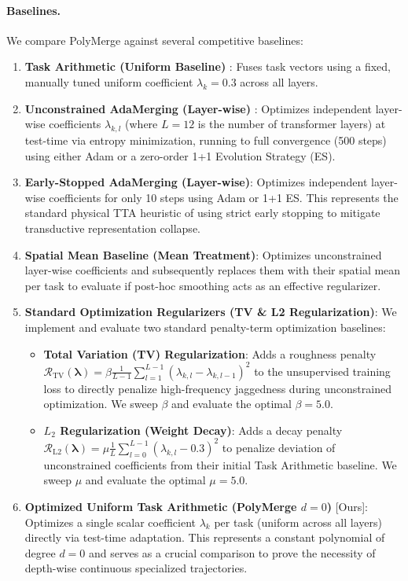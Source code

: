 \paragraph{Baselines.} We compare PolyMerge against several competitive baselines:
\begin{enumerate}
    \item \textbf{Task Arithmetic (Uniform Baseline)} \cite{ilharco2022editing}: Fuses task vectors using a fixed, manually tuned uniform coefficient $\lambda_k = 0.3$ across all layers.
    \item \textbf{Unconstrained AdaMerging (Layer-wise)} \cite{yang2024adamerging}: Optimizes independent layer-wise coefficients $\lambda_{k, l}$ (where $L=12$ is the number of transformer layers) at test-time via entropy minimization, running to full convergence (500 steps) using either Adam or a zero-order 1+1 Evolution Strategy (ES).
    \item \textbf{Early-Stopped AdaMerging (Layer-wise)}: Optimizes independent layer-wise coefficients for only 10 steps using Adam or 1+1 ES. This represents the standard physical TTA heuristic of using strict early stopping to mitigate transductive representation collapse.
    \item \textbf{Spatial Mean Baseline (Mean Treatment)}: Optimizes unconstrained layer-wise coefficients and subsequently replaces them with their spatial mean per task to evaluate if post-hoc smoothing acts as an effective regularizer.
    \item \textbf{Standard Optimization Regularizers (TV \& L2 Regularization)}: We implement and evaluate two standard penalty-term optimization baselines:
    \begin{itemize}
        \item \textbf{Total Variation (TV) Regularization}: Adds a roughness penalty $\mathcal{R}_{\text{TV}}(\boldsymbol{\lambda}) = \beta \frac{1}{L-1} \sum_{l=1}^{L-1} (\lambda_{k, l} - \lambda_{k, l-1})^2$ to the unsupervised training loss to directly penalize high-frequency jaggedness during unconstrained optimization. We sweep $\beta$ and evaluate the optimal $\beta = 5.0$.
        \item \textbf{$L_2$ Regularization (Weight Decay)}: Adds a decay penalty $\mathcal{R}_{\text{L2}}(\boldsymbol{\lambda}) = \mu \frac{1}{L} \sum_{l=0}^{L-1} (\lambda_{k, l} - 0.3)^2$ to penalize deviation of unconstrained coefficients from their initial Task Arithmetic baseline. We sweep $\mu$ and evaluate the optimal $\mu = 5.0$.
    \end{itemize}
    \item \textbf{Optimized Uniform Task Arithmetic (PolyMerge $d=0$)} [Ours]: Optimizes a single scalar coefficient $\lambda_k$ per task (uniform across all layers) directly via test-time adaptation. This represents a constant polynomial of degree $d=0$ and serves as a crucial comparison to prove the necessity of depth-wise continuous specialized trajectories.
\end{enumerate}

